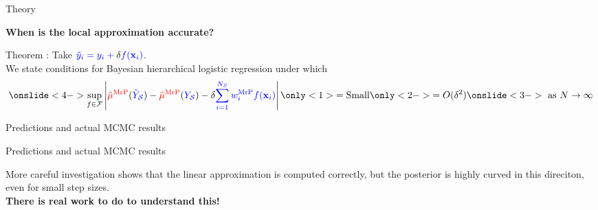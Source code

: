 







\begin{frame}[c]{Theory}

\textbf{When is the local approximation accurate?}

\begin{block}{Theorem \parencite{giordano:2026:mrplew}:}
    Take $\textcolor{blue}{\tilde{y}_i = y_i + \textcolor{black}{\delta} f(\mathbf{x}_i)}$.\\[1em]
    We state conditions for Bayesian hierarchical logistic regression under which
$$
\onslide<4->{\sup_{f \in \mathcal{F}}}
\abs{
    \muhatmrp[\Ytil] - \muhatmrp
    - \deltaf \surcol{\sumsur \w_i^\mrp \f(\x_i)}
}
\only<1>{ = \textrm{Small}}
\only<2->{ = O(\deltaf^2)}
\onslide<3->{\textrm{ as }N \rightarrow \infty}
$$
\end{block}



\end{frame}







\begin{frame}[t]{Predictions and actual MCMC results}
    \AlexanderRefitPlot{}
\end{frame}




\begin{frame}[t]{Predictions and actual MCMC results}
    \LaxRefitPlot{}

    \begin{center}
    More careful investigation shows that the linear
    approximation is computed correctly, but the posterior
    is highly curved in this direciton, even for small
    step sizes.\\[1em]
    \textbf{There is real work to do to understand this!}
    \end{center}
\end{frame}








